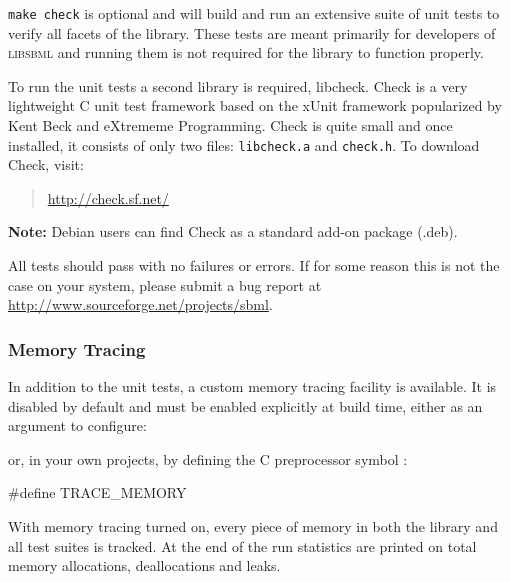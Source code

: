\documentclass{sbmlmanual}
\begin{document}
\begin{example}[csh]
\end{example}


\texttt{make check} is optional and will build and run an extensive
suite of unit tests to verify all facets of the library.  These tests
are meant primarily for developers of \textsc{libsbml} and running
them is not required for the library to function properly.

To run the unit tests a second library is required, libcheck.  Check
is a very lightweight C unit test framework based on the xUnit
framework popularized by Kent Beck and eXtrememe Programming.  Check
is quite small and once installed, it consists of only two files:
\texttt{libcheck.a} and \texttt{check.h}.  To download Check, visit:

\begin{quote}
\url{http://check.sf.net/}
\end{quote}

\textbf{Note:} Debian users can find Check as a standard add-on
package (.deb).

All tests should pass with no failures or errors.  If for some reason
this is not the case on your system, please submit a bug report at
\url{http://www.sourceforge.net/projects/sbml}.


\subsubsection{Memory Tracing}

In addition to the unit tests, a custom memory tracing facility is
available.  It is disabled by default and must be enabled explicitly
at build time, either as an argument to configure:

\begin{example}[csh]
\end{example}

or, in your own projects, by defining the C preprocessor symbol
:

\begin{example}[c]
  #define TRACE_MEMORY
\end{example}

With memory tracing turned on, every piece of memory in both the
library and all test suites is tracked.  At the end of the run
statistics are printed on total memory allocations, deallocations and
leaks.
\end{document}

